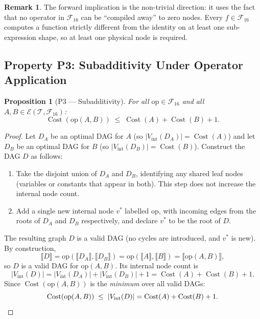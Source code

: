 \documentclass[12pt,a4paper]{article}
\newtheorem{proposition}[theorem]{Proposition}
\theoremstyle{definition}
\newtheorem{remark}[theorem]{Remark}
\newcommand{\Cost}{\operatorname{Cost}}
\newcommand{\Fam}{\mathcal{F}}
\begin{document}
\begin{remark}
The forward implication is the non-trivial direction: it uses the fact that no
operator in $\Fam_{16}$ can be ``compiled away'' to zero nodes.  Every $f \in
\Fam_{16}$ computes a function strictly different from the identity on at least
one sub-expression shape, so at least one physical node is required.
\end{remark}

\subsection{Property P3: Subadditivity Under Operator Application}

\begin{proposition}[P3 --- Subadditivity]
\label{prop:P3}
For all $\mathrm{op} \in \Fam_{16}$ and all
$A, B \in \mathcal{E}(\mathcal{T},\Fam_{16})$:
\[
  \Cost(\mathrm{op}(A, B))
  \;\leq\;
  \Cost(A) + \Cost(B) + 1.
\]
\end{proposition}

\begin{proof}
Let $D_A$ be an optimal DAG for $A$ (so $|V_{\mathrm{int}}(D_A)| = \Cost(A)$)
and let $D_B$ be an optimal DAG for $B$ (so $|V_{\mathrm{int}}(D_B)| = \Cost(B)$).
Construct the DAG $D$ as follows:
\begin{enumerate}
  \item Take the disjoint union of $D_A$ and $D_B$, identifying any shared leaf
        nodes (variables or constants that appear in both).  This step does not
        increase the internal node count.
  \item Add a single new internal node $v^*$ labelled $\mathrm{op}$, with
        incoming edges from the roots of $D_A$ and $D_B$ respectively, and
        declare $v^*$ to be the root of $D$.
\end{enumerate}
The resulting graph $D$ is a valid DAG (no cycles are introduced, and
$v^*$ is new).  By construction,
\[
  \llbracket D \rrbracket
  = \mathrm{op}(\llbracket D_A \rrbracket, \llbracket D_B \rrbracket)
  = \mathrm{op}(\llbracket A \rrbracket, \llbracket B \rrbracket)
  = \llbracket \mathrm{op}(A,B) \rrbracket,
\]
so $D$ is a valid DAG for $\mathrm{op}(A,B)$.  Its internal node count is
\[
  |V_{\mathrm{int}}(D)|
  = |V_{\mathrm{int}}(D_A)| + |V_{\mathrm{int}}(D_B)| + 1
  = \Cost(A) + \Cost(B) + 1.
\]
Since $\Cost(\mathrm{op}(A,B))$ is the \emph{minimum} over all valid DAGs:
\[
  \Cost(\mathrm{op}(A,B))
  \;\leq\;
  |V_{\mathrm{int}}(D)|
  = \Cost(A) + \Cost(B) + 1. \qedhere
\]
\end{proof}
\end{document}
